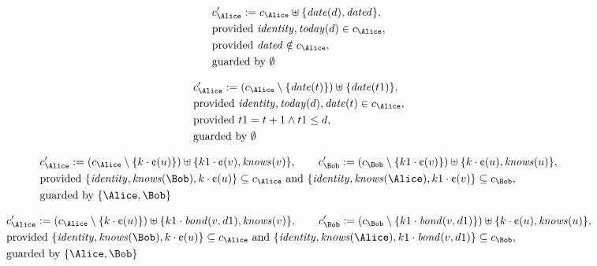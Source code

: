 \begin{align*}
&
c'_
{
\Alice
}
 := 
c_
{
\Alice
}
 \uplus 
\{
\mathit{
date
}
(
d
)
,
\mathit{
dated
}
\}
,\\
&
\text{provided } 
\mathit{
identity
}
,
\mathit{
today
}
(
d
)
 \in c_
{
\Alice
}
,\\
&
\text{provided } 
\mathit{
dated
}
 \notin c_
{
\Alice
}
,\\
&
\text{guarded by } \emptyset
\end{align*}

\begin{align*}
&
c'_
{
\Alice
}
 := 
(c_
{
\Alice
}
 \setminus 
\{
\mathit{
date
}
(
t
)
\}
) \uplus 
\{
\mathit{
date
}
(
t1
)
\}
,\\
&
\text{provided } 
\mathit{
identity
}
,
\mathit{
today
}
(
d
)
,
\mathit{
date
}
(
t
)
 \in c_
{
\Alice
}
,\\
&
\text{provided } 
t1
=
t
+ 1
\land
t1
\le
d
,\\
&
\text{guarded by } \emptyset
\end{align*}

\begin{align*}
&
c'_
{
\Alice
}
 := 
(c_
{
\Alice
}
 \setminus 
\{
k
\cdot
\text{\textcent}
(
u
)
\}
) \uplus 
\{
k1
\cdot
\text{\textcent}
(
v
)
,
\mathit{
knows
}
(
v
)
\}
, \qquad 
c'_
{
\Bob
}
 := 
(c_
{
\Bob
}
 \setminus 
\{
k1
\cdot
\text{\textcent}
(
v
)
\}
) \uplus 
\{
k
\cdot
\text{\textcent}
(
u
)
,
\mathit{
knows
}
(
u
)
\}
,\\
&
\text{provided } 
\{
\mathit{
identity
}
,
\mathit{
knows
}
(
\Bob
)
,
k
\cdot
\text{\textcent}
(
u
)
\}
 \subseteq c_
{
\Alice
}
 \text{ and } 
\{
\mathit{
identity
}
,
\mathit{
knows
}
(
\Alice
)
,
k1
\cdot
\text{\textcent}
(
v
)
\}
 \subseteq c_
{
\Bob
}
,\\
&
\text{guarded by } \{
\Alice
,
\Bob
\}
\end{align*}

\begin{align*}
&
c'_
{
\Alice
}
 := 
(c_
{
\Alice
}
 \setminus 
\{
k
\cdot
\text{\textcent}
(
u
)
\}
) \uplus 
\{
k1
\cdot
\mathit{
bond
}
(
v
,
d1
)
,
\mathit{
knows
}
(
v
)
\}
, \qquad 
c'_
{
\Bob
}
 := 
(c_
{
\Bob
}
 \setminus 
\{
k1
\cdot
\mathit{
bond
}
(
v
,
d1
)
\}
) \uplus 
\{
k
\cdot
\text{\textcent}
(
u
)
,
\mathit{
knows
}
(
u
)
\}
,\\
&
\text{provided } 
\{
\mathit{
identity
}
,
\mathit{
knows
}
(
\Bob
)
,
k
\cdot
\text{\textcent}
(
u
)
\}
 \subseteq c_
{
\Alice
}
 \text{ and } 
\{
\mathit{
identity
}
,
\mathit{
knows
}
(
\Alice
)
,
k1
\cdot
\mathit{
bond
}
(
v
,
d1
)
\}
 \subseteq c_
{
\Bob
}
,\\
&
\text{guarded by } \{
\Alice
,
\Bob
\}
\end{align*}
